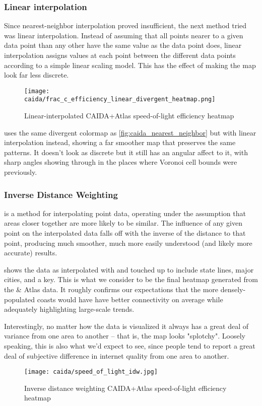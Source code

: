 \subsubsection{Linear interpolation}

Since nearest-neighbor interpolation proved insufficient, the next method tried was linear interpolation. Instead of assuming that all points nearer to a given data point than any other have the same value as the data point does, linear interpolation assigns values at each point between the different data points according to a simple linear scaling model. This has the effect of making the map look far less discrete.

\begin{figure}[h]
    \centering
    \texttt{[image: caida/frac\_c\_efficiency\_linear\_divergent\_heatmap.png]}
    \caption{Linear-interpolated CAIDA+Atlas speed-of-light efficiency heatmap}
    \label{fig:caida_linear_interpolation}
\end{figure}

 uses the same divergent colormap as \cref{fig:caida_nearest_neighbor} but with linear interpolation instead, showing a far smoother map that preserves the same patterns. It doesn't look as discrete but it still has an angular affect to it, with sharp angles showing through in the places where Voronoi cell bounds were previously.

\subsubsection{Inverse Distance Weighting}

\IDW is a method for interpolating point data, operating under the assumption that areas closer together are more likely to be similar. The influence of any given point on the interpolated data falls off with the inverse of the distance to that point, producing much smoother, much more easily understood (and likely more accurate) results.

 shows the data as interpolated with \idw and touched up to include state lines, major cities, and a key. This is what we consider to be the final heatmap generated from the \caida \& \ripe Atlas data. It roughly confirms our expectations that the more densely-populated coasts would have have better connectivity on average while adequately highlighting large-scale trends.

Interestingly, no matter how the data is visualized it always has a great deal of variance from one area to another -- that is, the map looks "splotchy". Loosely speaking, this is also what we'd expect to see, since people tend to report a great deal of subjective difference in internet quality from one area to another.

\begin{figure}[h]
    \centering
    \texttt{[image: caida/speed\_of\_light\_idw.jpg]}
    \caption{Inverse distance weighting CAIDA+Atlas speed-of-light efficiency heatmap}
    \label{fig:caida_idw_heatmap}
\end{figure}

